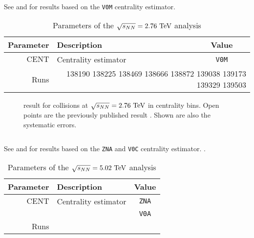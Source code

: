 \subsection{\PbPbCol{}}

See  and  for results
based on the \texttt{V0M} centrality estimator. 

\begin{table}[h!tbp]
  \caption{Parameters of the \PbPbCol{} $\usNN{PbPb}{2760}$ analysis}
  \centering
  \begin{tabular}[t]{|rlc|}
    \hline
    \headColor{} 
    \textbf{Parameter}
    & \textbf{Description}
    & \textbf{Value}\\
    \hline 
    $\text{CENT}$ 
    & Centrality estimator 
    & \texttt{V0M}\\
    \hline 
    \altRowColor{}
    Runs 
    & \multicolumn{2}{r|}{138190 138225 138469 138666 138872 139038
      139173 139329 139503}\\ 
    \hline
  \end{tabular}
  \label{tab:PbPb:params}
\end{table}
\begin{figure}[h!tbp]
  \centering
  \caption{\ndndeta{} result for \PbPbCol{} collisions at
    $\usNN{PbPb}{2760}$ in centrality bins.  Open points are the
    previously published result \cite{Abbas:2013bpa}. Shown are also
    the systematic errors.}
  \label{fig:PbPb:results}
\end{figure}

\subsection{\pPbCol{}}

See  and  for results
based on the \texttt{ZNA} and \texttt{V0C} centrality estimator. 
.

\begin{table}[h!tbp]
  \caption{Parameters of the \pPbCol{} $\usNN{PbPb}{5023}$ analysis}
  \centering
  \begin{tabular}[t]{|rlc|}
    \hline
    \headColor{} 
    \textbf{Parameter}
    & \textbf{Description}
    & \textbf{Value}\\
    \hline 
    $\text{CENT}$ 
    & Centrality estimator 
    & \texttt{ZNA}\\
    \altRowColor{}
    & 
    & \texttt{V0A}\\
    \hline 
    Runs 
    & \multicolumn{2}{r|}{}\\ 
    \hline
  \end{tabular}
  \label{tab:pPb:params}
\end{table}

